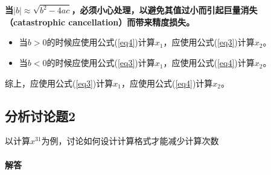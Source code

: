 \textbf{当$|b| \approx \sqrt{b^2 - 4ac}$，必须小心处理，以避免其值过小而引起巨量消失（catastrophic cancellation）而带来精度损失。}

\begin{itemize}
	\item 当$b > 0$的时候应使用公式(\ref{eq4})计算$x_1$，应使用公式(\ref{eq3})计算$x_2$。
	\item 当$b < 0$的时候应使用公式(\ref{eq3})计算$x_1$，应使用公式(\ref{eq4})计算$x_2$。
\end{itemize}



综上，应使用公式(\ref{eq3})计算$x_1$，应使用公式(\ref{eq4})计算$x_2$。



\subsection{分析讨论题2}

以计算$x^31$为例，讨论如何设计计算格式才能减少计算次数

\paragraph{解答}




